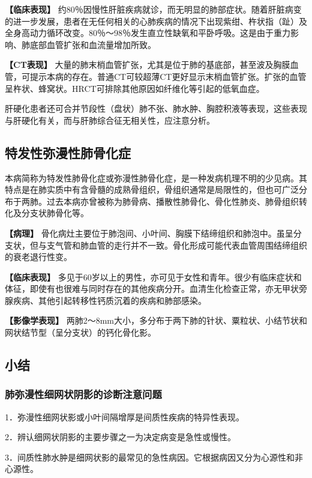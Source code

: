 \textbf{【临床表现】}
约80％因慢性肝脏疾病就诊，而无明显的肺部症状。随着肝脏病变的进一步发展，患者在无任何相关的心肺疾病的情况下出现紫绀、杵状指（趾）及全身高动力循环改变。80％～98％发生直立性缺氧和平卧呼吸。这是由于重力影响、肺底部血管扩张和血流量增加所致。

\textbf{【CT表现】}
大量的肺末梢血管扩张，尤其是位于肺的基底部，甚至波及胸膜血管，可提示本病的存在。普通CT可较超薄CT更好显示末梢血管扩张。扩张的血管呈杵状、蜂窝状。HRCT可排除其他原因如纤维化等引起的低氧血症。

肝硬化患者还可合并节段性（盘状）肺不张、肺水肿、胸腔积液等表现，这些表现与肝硬化有关，而与肝肺综合征无相关性，应注意分析。

\subsection{特发性弥漫性肺骨化症}

本病简称为特发性肺骨化症或弥漫性肺骨化症，是一种发病机理不明的少见病。其特点是在肺实质中有含骨髓的成熟骨组织，骨组织通常是局限性的，但也可广泛分布于两肺。过去本病亦曾被称为肺骨病、播散性肺骨化、骨化性肺炎、肺骨组织转化及分支状肺骨化等。

\textbf{【病理】}
骨化病灶主要位于肺泡间、小叶间、胸膜下结缔组织和肺泡中。虽呈分支状，但与支气管和肺血管的走行并不一致。骨化形成可能代表血管周围结缔组织的衰老退行性变。

\textbf{【临床表现】}
多见于60岁以上的男性，亦可见于女性和青年。很少有临床症状和体征，即使有也很难与同时存在的其他疾病分开。血清生化检查正常，亦无甲状旁腺疾病、其他引起转移性钙质沉着的疾病和肺部感染。

\textbf{【影像学表现】}
两肺2～8mm大小，多分布于两下肺的针状、粟粒状、小结节状和网状结节型（呈分支状）的钙化骨化影。

\subsection{小结}

\subsubsection{肺弥漫性细网状阴影的诊断注意问题}

1．弥漫性细网状影或小叶间隔增厚是间质性疾病的特异性表现。

2．辨认细网状阴影的主要步骤之一为决定病变是急性或慢性。

3．间质性肺水肿是细网状影的最常见的急性病因。它根据病因又分为心源性和非心源性。

